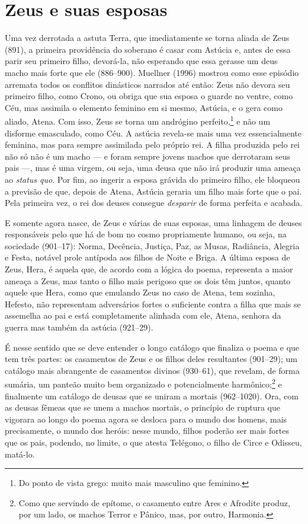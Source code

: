 \section{Zeus e suas esposas}

Uma vez derrotada a astuta Terra, que imediatamente se torna aliada de
Zeus (891), a primeira providência do soberano é casar com Astúcia e,
antes de essa parir seu primeiro filho, devorá-la, não esperando que
essa gerasse um deus macho mais forte que ele (886--900). Muellner (1996)
mostrou como esse episódio arremata todos os conflitos dinásticos
narrados até então: Zeus não devora seu primeiro filho, como Crono, ou
obriga que sua esposa o guarde no ventre, como Céu, mas assimila o
elemento feminino em si mesmo, Astúcia, e o gera como aliado, Atena.
Com isso, Zeus se torna um andrógino perfeito,\footnote{Do ponto de vista grego:
muito mais masculino que feminino.} e não um disforme emasculado, como
Céu. A astúcia revela-se mais uma vez essencialmente feminina, mas para
sempre assimilada pelo próprio rei. A filha produzida pelo rei não só
não é um macho --- e foram sempre jovens machos que derrotaram seus pais
---, mas é uma virgem, ou seja, uma deusa que não irá produzir uma ameaça
ao \textit{status quo}. Por fim, ao ingerir a esposa grávida do primeiro
filho, ele bloqueou a previsão de que, depois de Atena, Astúcia geraria
um filho mais forte que o pai. Pela primeira vez, o rei dos deuses
consegue \textit{desparir} de forma perfeita e acabada.

E somente agora nasce, de Zeus e várias de suas esposas, uma linhagem de
deuses responsáveis pelo que há de bom no cosmo propriamente humano, ou
seja, na sociedade (901--17): Norma, Decência, Justiça, Paz, as Musas,
Radiância, Alegria e Festa, notável prole antípoda aos filhos de Noite e
Briga. A última esposa de Zeus, Hera, é aquela que, de acordo com a
lógica do poema, representa a maior ameaça a Zeus, mas tanto o filho
mais perigoso que os dois têm juntos, quanto aquele que Hera, como que
emulando Zeus no caso de Atena, tem sozinha, Hefesto, não representam
adversários fortes o suficiente contra a filha que mais se assemelha ao
pai e está completamente alinhada com ele, Atena, senhora da guerra mas
também da astúcia (921--29).

É nesse sentido que se deve entender o longo catálogo que finaliza o
poema e que tem três partes: os casamentos de Zeus e os filhos deles
resultantes (901--29); um catálogo mais abrangente de casamentos divinos
(930--61), que revelam, de forma sumária, um panteão muito bem organizado
e potencialmente harmônico;\footnote{Como que servindo de epítome, o casamento
entre Ares e Afrodite produz, por um lado, os machos Terror e Pânico,
mas, por outro, Harmonia.} e finalmente um catálogo de deusas que se
uniram a mortais (962--1020). Ora, com as deusas fêmeas que se unem a
machos mortais, o princípio de ruptura que vigorara ao longo do poema
agora se desloca para o mundo dos homens, mais precisamente, o mundo dos
heróis: nesse mundo, filhos poderão ser mais fortes que os pais,
podendo, no limite, o que atesta Telégono, o filho de Circe e Odisseu,
matá-lo.

